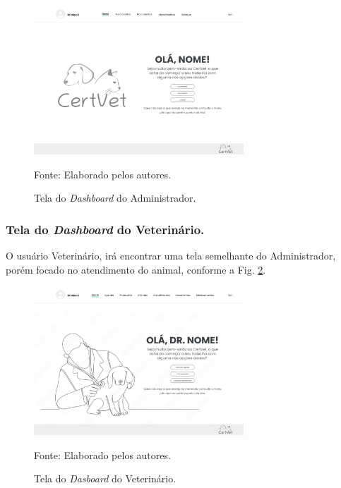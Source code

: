 \documentclass[
    12pt,               %
    openright,          %
    oneside,
    a4paper,            %
    BIBLATEX,           %
    TODO,               %
    english,            %
    brazil              %
    ]{ifsp-spo-inf-ctds}
\begin{document}
 \begin{figure}[H]
                \centering
                \caption{Tela do \emph{Dashboard} do Administrador.}
                \includegraphics[width=0.7\textwidth]{images/Telas/Dashboard - ADMIN.png}
                
                \label{fig:DashAdm}
                \centering
        {\footnotesize Fonte: Elaborado pelos autores.}
            \end{figure}

    \subsubsection{Tela do \emph{Dashboard} do Veterinário.}
    O usuário Veterinário, irá encontrar uma tela semelhante do Administrador, porém focado no atendimento do animal, conforme a Fig. \ref{fig:DashVet}.
    
         \begin{figure}[H]
                \centering
                \caption{Tela do \emph{Dasboard} do Veterinário.}
                \includegraphics[width=0.7\textwidth]{images/Telas/Dashboard - VETERINARIO.png}
                
                \label{fig:DashVet}
                \centering
        {\footnotesize Fonte: Elaborado pelos autores.}
            \end{figure}    
\end{document}
